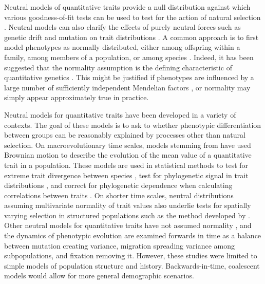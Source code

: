 Neutral models of quantitative traits provide a null distribution against which
various goodness-of-fit tests can be used to test for the action of natural
selection \citep{Lande1976,Leinonen2013}. Neutral models can also clarify the
effects of purely neutral forces such as genetic drift and mutation on trait
distributions \citep{Lynch1986}. A common approach is to first model phenotypes
as normally distributed, either among offspring within a family, among members
of a population, or among species \citep{Turelli2017}. Indeed, it has been
suggested that the normality assumption is the defining characteristic of
quantitative genetics \citep{Rice2004}. This might be justified if phenotypes
are influenced by a large number of sufficiently independent Mendelian
factors \citep{Fisher1918}, or normality may simply appear approximately true in
practice.

Neutral models for quantitative traits have been developed in a variety of
contexts. The goal of these models is to ask to whether phenotypic
differentiation between groups can be reasonably explained by processes other
than natural selection. On macroevolutionary time scales, models stemming
from \citet{Lande1976} have used Brownian motion to describe the evolution of
the mean value of a quantitative trait in a population. These models are used in
statistical methods to test for extreme trait divergence between
species \citep{Turelli1988}, test for phylogenetic signal in trait
distributions \citep{Freckleton2002}, and correct for phylogenetic dependence
when calculating correlations between traits \citep{Felsenstein1985}. On shorter
time scales, neutral distributions assuming multivariate normality of trait
values also underlie tests for spatially varying selection in structured
populations such as the method developed by \citet{Ovaskainen2011}. Other
neutral models for quantitative traits have not assumed
normality \citep{Chakraborty1982,Lynch1986,Lande1992}, and the dynamics of
phenotypic evolution are examined forwards in time as a balance between mutation
creating variance, migration spreading variance among subpopulations, and
fixation removing it. However, these studies were limited to simple models of
population structure and history. Backwards-in-time, coalescent models would
allow for more general demographic scenarios.

